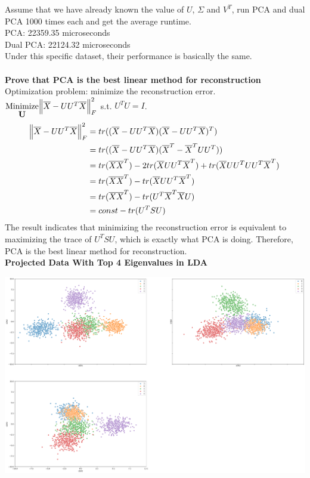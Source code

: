 \documentclass[12pt]{article}
\begin{document}
\noindent
Assume that we have already known the value of $U$, $\Sigma$ and $V^T$, run PCA and dual PCA 1000 times each and get the average runtime.\\
PCA: 22359.35 microseconds\\
Dual PCA: 22124.32 microseconds\\
Under this specific dataset, their performance is basically the same.\\\\
\textbf{Prove that PCA is the best linear method for reconstruction}\\
Optimization problem: minimize the reconstruction error. $\stackunder{Minimize}{\textbf{U}}\norm{\overline{X}-UU^T\overline{X}}_F^2$ s.t. $U^TU=I$.
\begin{equation}
\begin{split}
\norm{\overline{X}-UU^T\overline{X}}_F^2 & = tr((\overline{X}-UU^T\overline{X})(\overline{X}-UU^T\overline{X})^T)\\
& = tr((\overline{X}-UU^T\overline{X})(\overline{X}^T-\overline{X}^TUU^T))\\
& = tr(\overline{X}\overline{X}^T) - 2tr(\overline{X}UU^T\overline{X}^T) + tr(\overline{X}UU^TUU^T\overline{X}^T)\\
& = tr(\overline{X}\overline{X}^T) - tr(\overline{X}UU^T\overline{X}^T)\\
& = tr(\overline{X}\overline{X}^T) - tr(U^T\overline{X}^T\overline{X}U)\\
& = const - tr(U^TSU)
\end{split}
\end{equation}
\noindent
The result indicates that minimizing the reconstruction error is equivalent to maximizing the trace of $U^TSU$, which is exactly what PCA is doing. Therefore, PCA is the best linear method for reconstruction.\\
\textbf{Projected Data With Top 4 Eigenvalues in LDA}
\vspace*{-1.0cm}
\begin{center}
    \includegraphics[width=18cm]{Q2_LDATop3.png}
\end{center}
\end{document}
